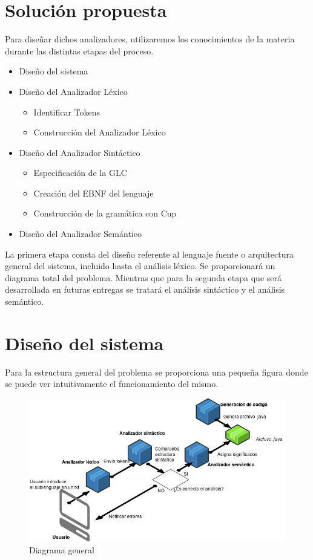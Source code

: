 \documentclass[12pt,a4paper]{article}
\begin{document}
\section{Solución propuesta}
Para diseñar dichos analizadores, utilizaremos los conocimientos de la materia durante las distintas etapas del proceso.

\begin{itemize}
	\item Diseño del sistema
	\item Diseño del Analizador Léxico  \begin{itemize}
		\item Identificar Tokens
		\item Construcción del Analizador Léxico
	\end{itemize}
	
	\item Diseño del Analizador Sintáctico  \begin{itemize}
		\item Especificación de la GLC
		\item Creación del EBNF del lenguaje
		\item Construcción de la gramática con Cup
	\end{itemize}
	\item Diseño del Analizador Semántico
	
\end{itemize}
La primera etapa consta del diseño referente al lenguaje fuente o arquitectura general del sistema, incluido hasta el análisis léxico. Se proporcionará un diagrama total del problema.
\newline\newline
Mientras que para la segunda etapa que será desarrollada en futuras entregas se tratará el análisis sintáctico y el análisis semántico.
\clearpage
\section{Diseño del sistema}
Para la estructura general del problema se proporciona una pequeña figura \cite{draw} donde se puede ver intuitivamente el funcionamiento del mismo.

\begin{figure}[h]
	\centering
	\includegraphics[width=0.9\linewidth]{img/Diagrama_sistema}
	\caption{Diagrama general}
	\label{fig:diagrama-sistema}
\end{figure}
\end{document}
